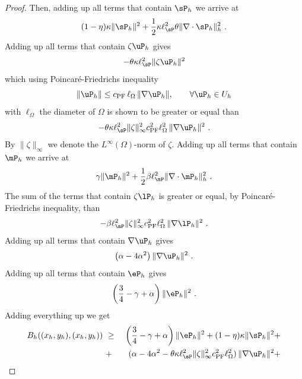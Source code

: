 \begin{proof}
	Then, adding up all terms that contain $\sP_h$ we arrive at
	\begin{equation}
		(1-\eta) \kappa \|\sP_h\|^2 + \frac12 \kappa \ell_{\sP}^2 
		\theta  \|\nabla\cdot \sP_h\|_h^2~.
		\label{eq:term1}
	\end{equation}
	Adding up all terms that contain $\zeta \uP_h$ gives
	$$
	-\theta \kappa \ell_{\sP}^2 \|\zeta \uP_h\|^2
	$$
	which using Poincar\'e-Friedrichs inequality
	\begin{equation}
		\|\uP_h\| \leq c_{\mbox{\scriptsize{PF}}}\,\ell_{\Omega}\,\|\nabla \uP_h\|, \qquad \forall \uP_h\in U_h
		\label{eq:poincare}
	\end{equation}
	with $\ell_{\Omega}$ the diameter of $\Omega$ is shown to be greater or equal than 
	\begin{equation}
		- {\theta \kappa \ell_{\sP}^2 \|\zeta\|_{\infty}^2 c_{\mbox{\scriptsize{PF}}}^2 \ell_{\Omega}^2}\,\|\nabla \uP_h \|^2~.
		\label{eq:term2}
	\end{equation}
	By $\|\zeta\|_{\infty}$ we denote the $L^{\infty}(\Omega)$-norm of $\zeta$. Adding up all terms that contain $\mP_h$ we arrive at
	\begin{equation}
		\gamma \|\mP_h\|^2 +\frac12 \beta\ell_{\mP}^2  \|\nabla \cdot \mP_h \|_h^2~.
		\label{eq:term4}
	\end{equation}
	The sum of the terms that contain $\zeta \lP_h$ is greater or equal, by Poincaré-Friedrichs inequality, than
	\begin{equation}
		- \beta \ell_{\mP}^2 \|\zeta\|_{\infty}^2 c_{\mbox{\scriptsize{PF}}}^2 \ell_{\Omega}^2\,\|\nabla \lP_h \|^2~.
		\label{eq:term5}
	\end{equation}
	Adding up all terms that contain $\nabla \uP_h$ gives
	\begin{equation}
		\left ( \alpha - 4 \alpha^2 \right )
		\|\nabla \uP_h\|^2~.
		\label{eq:term6}
	\end{equation}
	Adding up all terms that contain $\eP_h$ gives
	\begin{equation}
		\left ( \frac34-\gamma + \alpha \right ) \|\eP_h\|^2~.
		\label{eq:term7}
	\end{equation}
	Adding everything up we get
	\begin{eqnarray}
		B_h((x_h,y_h),(x_h,y_h))~&\geq&~ \left (\frac34 -\gamma+\alpha \right ) \|\eP_h\|^2 + (1-\eta)\kappa \|\sP_h\|^2 + \nonumber \\
		~&+&~ (\alpha - 4 \alpha^2 - \theta \kappa \ell_{\sP}^2 \|\zeta\|_{\infty}^2 c_{\mbox{\scriptsize{PF}}}^2 \ell_{\Omega}^2)\, \|\nabla \uP_h\|^2 + \nonumber \\

\end{eqnarray}
\end{proof}
